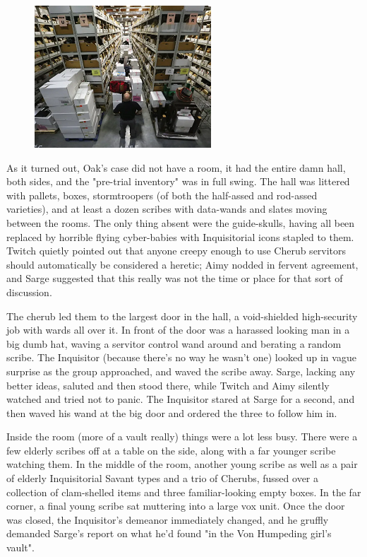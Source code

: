 \begin{figure}
	\begin{center}
		\includegraphics[width=\figwidth]{pics/21/80.png}
	\end{center}
\end{figure}
As it turned out, Oak's case did not have a room, it had the entire damn hall, both sides, and the "pre-trial inventory" was in full swing. 
The hall was littered with pallets, boxes, stormtroopers (of both the half-assed and rod-assed varieties), and at least a dozen scribes with data-wands and slates moving between the rooms. 
The only thing absent were the guide-skulls, having all been replaced by horrible flying cyber-babies with Inquisitorial icons stapled to them. 
Twitch quietly pointed out that anyone creepy enough to use Cherub servitors should automatically be considered a heretic; 
Aimy nodded in fervent agreement, and Sarge suggested that this really was not the time or place for that sort of discussion.

The cherub led them to the largest door in the hall, a void-shielded high-security job with wards all over it. 
In front of the door was a harassed looking man in a big dumb hat, waving a servitor control wand around and berating a random scribe. 
The Inquisitor (because there's no way he wasn't one) looked up in vague surprise as the group approached, and waved the scribe away. 
Sarge, lacking any better ideas, saluted and then stood there, while Twitch and Aimy silently watched and tried not to panic. 
The Inquisitor stared at Sarge for a second, and then waved his wand at the big door and ordered the three to follow him in.

Inside the room (more of a vault really) things were a lot less busy. 
There were a few elderly scribes off at a table on the side, along with a far younger scribe watching them. 
In the middle of the room, another young scribe as well as a pair of elderly Inquisitorial Savant types and a trio of Cherubs, fussed over a collection of clam-shelled items and three familiar-looking empty boxes. 
In the far corner, a final young scribe sat muttering into a large vox unit. 
Once the door was closed, the Inquisitor's demeanor immediately changed, and he gruffly demanded Sarge's report on what he'd found "in the Von Humpeding girl's vault".

